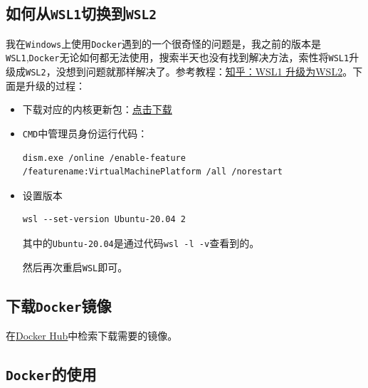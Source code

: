 \documentclass[
]{book}
\begin{document}
\hypertarget{ux5982ux4f55ux4ecewsl1ux5207ux6362ux5230wsl2}{%
\subsection{\texorpdfstring{如何从\texttt{WSL1}切换到\texttt{WSL2}}{如何从WSL1切换到WSL2}}\label{ux5982ux4f55ux4ecewsl1ux5207ux6362ux5230wsl2}}

我在\texttt{Windows}上使用\texttt{Docker}遇到的一个很奇怪的问题是，我之前的版本是\texttt{WSL1},\texttt{Docker}无论如何都无法使用，搜索半天也没有找到解决方法，索性将\texttt{WSL1}升级成\texttt{WSL2}，没想到问题就那样解决了。参考教程：\href{https://zhuanlan.zhihu.com/p/356397851}{知乎：WSL1 升级为WSL2}。下面是升级的过程：

\begin{itemize}
\item
  下载对应的内核更新包：\href{https://link.zhihu.com/?target=https\%3A//wslstorestorage.blob.core.windows.net/wslblob/wsl_update_x64.msi}{点击下载}
\item
  \texttt{CMD}中管理员身份运行代码：

\begin{verbatim}
dism.exe /online /enable-feature /featurename:VirtualMachinePlatform /all /norestart
\end{verbatim}
\item
  设置版本

\begin{verbatim}
wsl --set-version Ubuntu-20.04 2
\end{verbatim}

  其中的\texttt{Ubuntu-20.04}是通过代码\texttt{wsl\ -l\ -v}查看到的。

  然后再次重启\texttt{WSL}即可。
\end{itemize}

\hypertarget{ux4e0bux8f7ddockerux955cux50cf}{%
\subsection{\texorpdfstring{下载\texttt{Docker}镜像}{下载Docker镜像}}\label{ux4e0bux8f7ddockerux955cux50cf}}

在\href{https://hub.docker.com/}{Docker Hub}中检索下载需要的镜像。

\hypertarget{dockerux7684ux4f7fux7528-1}{%
\subsection{\texorpdfstring{\texttt{Docker}的使用}{Docker的使用}}\label{dockerux7684ux4f7fux7528-1}}
\end{document}
